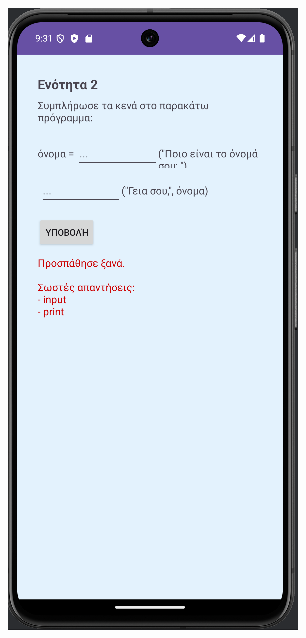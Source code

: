 \documentclass[11pt]{report}
\begin{document}
\begin{figure}[H]
  \centering
  \begin{minipage}[b]{0.45\textwidth}
    \includegraphics[width=\linewidth, height=0.35\textheight, keepaspectratio]{Figures/εικόνα (3).png}

\end{minipage}
\end{figure}
\end{document}
